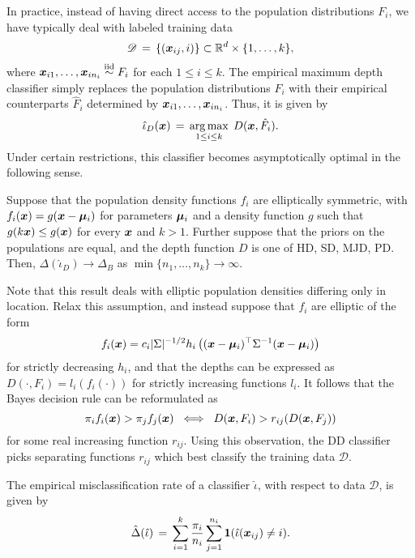 In practice, instead of having direct access to the population distributions
$F_i$, we have typically deal with labeled training data
\begin{equation}
    \mathscr{D} \,=\, \{(\bm{x}_{ij}, i)\} \subset \mathbb{R}^d \times \{1, \dots, k\},
\end{equation}
where $\bm{x}_{i1}, \dots, \bm{x}_{in_i} \overset{\text{iid}}{\sim} F_i$ for each $1 \leq i \leq k$.
The empirical maximum depth classifier simply replaces the population
distributions $F_i$ with their empirical counterparts $\hat{F}_i$ determined
by $\bm{x}_{i1}, \dots, \bm{x}_{in_i}$. Thus, it is given by
\begin{equation}
    \hat{\iota}_{D}(\bm{x}) \,=\, \operatorname*{arg\,max}_{1 \leq i \leq k}\; D(\bm{x}, \hat{F}_i).
\end{equation}
Under certain restrictions, this classifier becomes asymptotically optimal in
the following sense.

\begin{theorem}
    Suppose that the population density functions $f_i$ are elliptically
    symmetric, with $f_i(\bm{x}) = g(\bm{x} - \bm{\mu}_i)$ for parameters $\bm{\mu}_i$ and a
    density function $g$ such that $g(k\bm{x}) \leq g(\bm{x})$ for every $\bm{x}$ and
    $k > 1$. Further suppose that the priors on the populations are equal, and
    the depth function $D$ is one of HD, SD, MJD, PD. Then,
    $\Delta(\hat{\iota}_{D}) \to \Delta_B$ as $\min\{n_1, \dots,
    n_k\} \to \infty$.
\end{theorem}

Note that this result deals with elliptic population densities differing only
in location.
Relax this assumption, and instead suppose that $f_i$ are elliptic of the form
\begin{equation}
    f_i(\bm{x}) = c_i |\Sigma|^{-1/2} h_i\left((\bm{x} - \bm{\mu}_i)^\top \Sigma^{-1} (\bm{x} - \bm{\mu}_i)\right)
\end{equation}
for strictly decreasing $h_i$, and that the depths can be expressed as
$D(\cdot, F_i) = l_i(f_i(\cdot))$ for strictly increasing functions $l_i$.
It follows that the Bayes decision rule can be reformulated as
\begin{equation}
    \pi_i f_i(\bm{x}) > \pi_j f_j(\bm{x}) \;\iff\; D(\bm{x}, F_i) > r_{ij}(D(\bm{x}, F_j))
\end{equation}
for some real increasing function $r_{ij}$.
Using this observation, the DD classifier \parencite{li-albertos-liu-2012}
picks separating functions $r_{ij}$ which best classify the training data
$\mathscr{D}$.

\begin{definition}
    The empirical misclassification rate of a classifier $\hat{\iota}$, with
    respect to data $\mathscr{D}$, is given by
    \begin{equation}
        \hat{\Delta}(\hat{\iota}) \,=\, \sum_{i = 1}^k \frac{\pi_i}{n_i}\sum_{j = 1}^{n_i} \bm{1}(\hat{\iota}(\bm{x}_{ij}) \neq i).
    \end{equation}
\end{definition}


